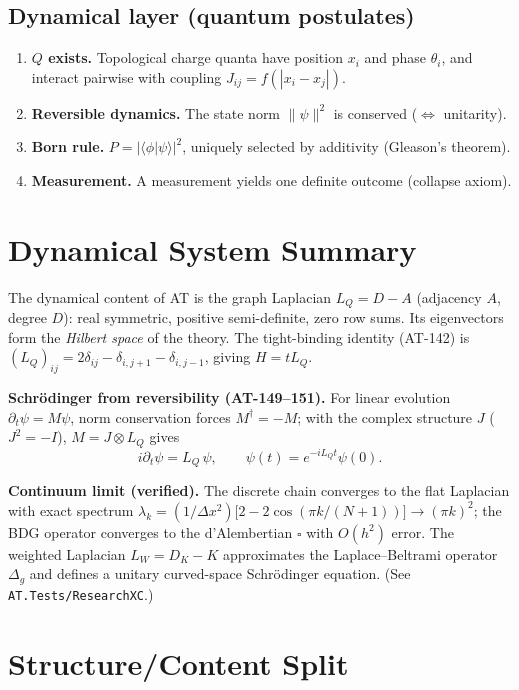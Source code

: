 \documentclass[11pt,a4paper]{article}
\begin{document}
\subsection{Dynamical layer (quantum postulates)}
\begin{enumerate}
\item \textbf{$Q$ exists.} Topological charge quanta have position $x_i$ and phase
      $\theta_i$, and interact pairwise with coupling $J_{ij}=f(|x_i-x_j|)$.
\item \textbf{Reversible dynamics.} The state norm $\|\psi\|^2$ is conserved
      ($\Leftrightarrow$ unitarity).
\item \textbf{Born rule.} $P=|\langle\phi|\psi\rangle|^2$, uniquely selected by additivity
      (Gleason's theorem).
\item \textbf{Measurement.} A measurement yields one definite outcome (collapse axiom).
\end{enumerate}

\section{Dynamical System Summary}
\label{sec:dynamics}

The dynamical content of AT is the graph Laplacian $L_Q=D-A$ (adjacency $A$, degree $D$):
real symmetric, positive semi-definite, zero row sums. Its eigenvectors form the
\emph{Hilbert space} of the theory. The tight-binding identity (AT-142) is
$(L_Q)_{ij}=2\delta_{ij}-\delta_{i,j+1}-\delta_{i,j-1}$, giving $H=tL_Q$.

\textbf{Schr\"odinger from reversibility (AT-149--151).} For linear evolution
$\partial_t\psi=M\psi$, norm conservation forces $M^\dagger=-M$; with the complex
structure $J$ ($J^2=-I$), $M=J\otimes L_Q$ gives
\begin{equation}
i\partial_t\psi = L_Q\,\psi,\qquad \psi(t)=e^{-iL_Qt}\psi(0).
\end{equation}

\textbf{Continuum limit (verified).} The discrete chain converges to the flat Laplacian
with exact spectrum $\lambda_k=(1/\Delta x^2)\bigl[2-2\cos(\pi k/(N{+}1))\bigr]\to(\pi k)^2$;
the BDG operator converges to the d'Alembertian $\square$ with $O(h^2)$ error. The weighted
Laplacian $L_W=D_K-K$ approximates the Laplace--Beltrami operator $\Delta_g$ and defines a
unitary curved-space Schr\"odinger equation. (See \texttt{AT.Tests/ResearchXC}.)

\section{Structure/Content Split}
\label{sec:split}
\end{document}
